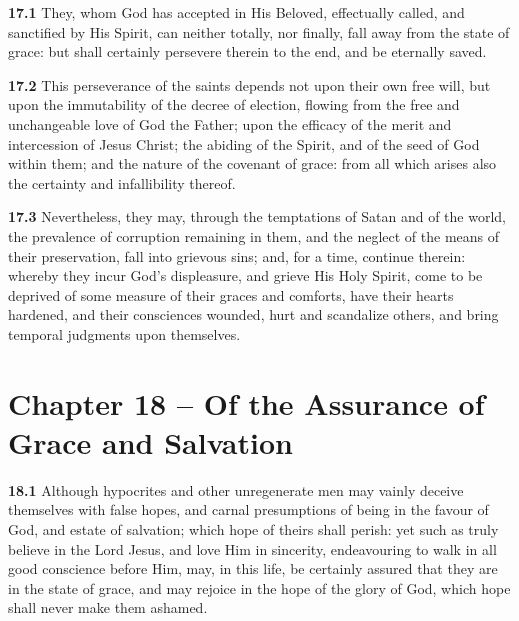\par\textbf{17.1} They, whom God has accepted in His Beloved, effectually called, and sanctified by His Spirit, can neither totally, nor finally, fall away from the state of grace: but shall certainly persevere therein to the end, and be eternally saved.   

\par\textbf{17.2} This perseverance of the saints depends not upon their own free will, but upon the immutability of the decree of election, flowing from the free and unchangeable love of God the Father; upon the efficacy of the merit and intercession of Jesus Christ; the abiding of the Spirit, and of the seed of God within them; and the nature of the covenant of grace: from all which arises also the certainty and infallibility thereof.   

\par\textbf{17.3} Nevertheless, they may, through the temptations of Satan and of the world, the prevalence of corruption remaining in them, and the neglect of the means of their preservation, fall into grievous sins; and, for a time, continue therein: whereby they incur God's displeasure, and grieve His Holy Spirit, come to be deprived of some measure of their graces and comforts, have their hearts hardened, and their consciences wounded, hurt and scandalize others, and bring temporal judgments upon themselves.

\section{Chapter 18 -- Of the Assurance of Grace and Salvation}

\par\textbf{18.1} Although hypocrites and other unregenerate men may vainly deceive themselves with false hopes, and carnal presumptions of being in the favour of God, and estate of salvation; which hope of theirs shall perish: yet such as truly believe in the Lord Jesus, and love Him in sincerity, endeavouring to walk in all good conscience before Him, may, in this life, be certainly assured that they are in the state of grace, and may rejoice in the hope of the glory of God, which hope shall never make them ashamed.   

